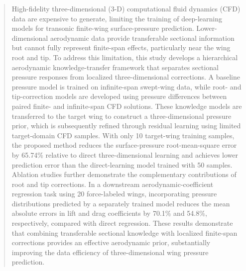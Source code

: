 
\begin{abstract}
High-fidelity three-dimensional (3-D) computational fluid dynamics (CFD) data are expensive to generate, limiting the training of deep-learning models for transonic finite-wing surface-pressure prediction. Lower-dimensional aerodynamic data provide transferable sectional information but cannot fully represent finite-span effects, particularly near the wing root and tip. To address this limitation, this study develops a hierarchical aerodynamic knowledge-transfer framework that separates sectional pressure responses from localized three-dimensional corrections. A baseline pressure model is trained on infinite-span swept-wing data, while root- and tip-correction models are developed using pressure differences between paired finite- and infinite-span CFD solutions. These knowledge models are transferred to the target wing to construct a three-dimensional pressure prior, which is subsequently refined through residual learning using limited target-domain CFD samples. With only 10 target-wing training samples, the proposed method reduces the surface-pressure root-mean-square error by 65.74\% relative to direct three-dimensional learning and achieves lower prediction error than the direct-learning model trained with 50 samples. Ablation studies further demonstrate the complementary contributions of root and tip corrections. In a downstream aerodynamic-coefficient regression task using 20 force-labeled wings, incorporating pressure distributions predicted by a separately trained model reduces the mean absolute errors in lift and drag coefficients by 70.1\% and 54.8\%, respectively, compared with direct regression. These results demonstrate that combining transferable sectional knowledge with localized finite-span corrections provides an effective aerodynamic prior, substantially improving the data efficiency of three-dimensional wing pressure prediction.
\end{abstract}
